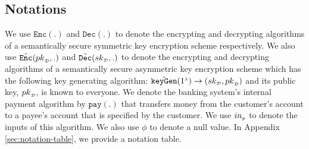 \subsection{Notations}
We use $\mathtt{Enc}(.)$  and $\mathtt{Dec}(.)$ to denote the encrypting and decrypting algorithms of   a semantically secure symmetric key encryption scheme respectively. We also use  ${ \tilde {\mathtt{Enc}}}({pk}_{\scriptscriptstyle\mathcal {D}}, .)$ and   ${\tilde{\mathtt {Dec}}}({sk}_{\scriptscriptstyle\mathcal {D}}, .)$ to denote the encrypting and decrypting algorithms of   a semantically secure asymmetric key encryption scheme  which has  the following key generating algorithm:  $\tilde{\mathtt{keyGen}}(1^{\scriptscriptstyle\lambda})\rightarrow({sk}_{\scriptscriptstyle\mathcal {D}}, {pk}_{\scriptscriptstyle\mathcal {D}})$ and its  public key, ${pk}_{\scriptscriptstyle\mathcal {D}}$, is known to everyone.  We denote the banking system's internal payment  algorithm by  $\mathtt{pay}(.)$ that  transfers money from the customer's account to a payee's account that is specified by the customer.  We use $in_{\scriptscriptstyle p}$ to denote the inputs of this algorithm.  We also use $\phi$ to denote a null value. In Appendix \ref{sec:notation-table}, we provide a notation table. 







